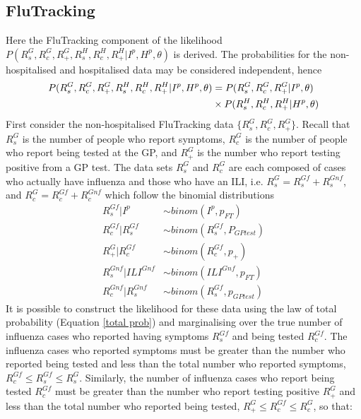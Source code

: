 \subsection{FluTracking}
Here the FluTracking component of the likelihood $P(R_s^G,R_c^G, R_+^G, R_s^H, R_c^H, R_+^H | I^p, H^p, \theta)$ is derived. The probabilities for the non-hospitalised and hospitalised data may be considered independent, hence
\begin{align} \notag
	P(R_s^G,R_c^G, R_+^G, R_s^H, R_c^H, R_+^H | I^p, H^p, \theta) &= P(R_s^G,R_c^G, R_+^G | I^p, \theta ) \\ \label{eq: P(FT) joint}
	&\times P(R_s^H, R_c^H, R_+^H | H^p, \theta)	
\end{align}
First consider the non-hospitalised FluTracking data $\{R_s^G,R_c^G, R_+^G\}$. Recall that $R_s^G$ is the number of people who report symptoms, $R_c^G$ is the number of people who report being tested at the GP, and $R_+^G$ is the number who report testing positive from a GP test. The data sets $R_s^G$ and $R_c^G$ are each composed of cases who actually have influenza and those who have an ILI, i.e. $R_{s}^{G} = R_{s}^{Gf} + R_{s}^{Gnf}$, and $R_{c}^{G} = R_{c}^{Gf} + R_{c}^{Gnf}$ which follow the binomial distributions
\begin{align} \label{P(R_s^G)}
R_{s}^{Gf} | I^{p} &\sim binom(I^{p}, p_{FT}) \\ \label{P(R_c^G)}
R_{c}^{Gf} | R_{s}^{Gf} &\sim binom(R_{s}^{Gf}, P_{GPtest}) \\ \label{P(R_+^G)}
R_+^G | R_{c}^{Gf} &\sim binom(R_{c}^{Gf}, p_+) \\ \label{P(R_s^Gnf)}
R_s^{Gnf} | ILI^{Gnf} &\sim binom(ILI^{Gnf},p_{FT}) \\ \label{P(R_c^Gnf)}
R_c^{Gnf} | R_s^{Gnf} &\sim binom(R_{s}^{Gf},p_{GPtest})
\end{align}
It is possible to construct the likelihood for these data using the law of total probability (Equation \ref{total prob}) and marginalising over the true number of influenza cases who reported having symptoms $R_s^{Gf}$ and being tested $R_c^{Gf}$. The influenza cases who reported symptoms must be greater than the number who reported being tested and less than the total number who reported symptoms, $R_c^{Gf} \leq R_s^{Gf} \leq R_s^{G}$. Similarly, the number of influenza cases who report being tested $R_c^{Gf}$ must be greater than the number who report testing positive $R_+^{G}$ and less than the total number who reported being tested, $R_+^{G} \leq R_c^{Gf} \leq R_c^{G}$, so that:
